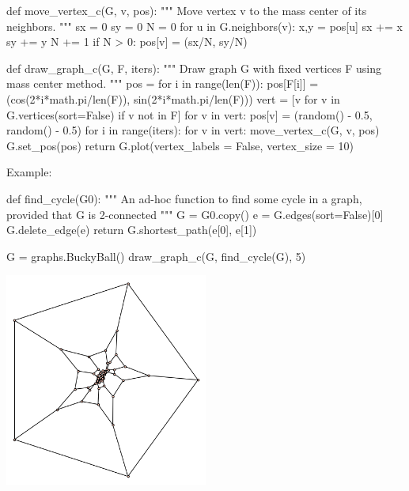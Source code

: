 \medskip
\begin{sageCell}
def move_vertex_c(G, v, pos):
    """
    Move vertex v to the mass center of its neighbors.
    """
    sx = 0
    sy = 0
    N = 0
    for u in G.neighbors(v):
        x,y = pos[u]
        sx += x
        sy += y
        N += 1
    if N > 0:
        pos[v] = (sx/N, sy/N)
\end{sageCell}
\begin{sageCell}
def draw_graph_c(G, F, iters):
    """
    Draw graph G with fixed vertices F using mass center method.
    """
    pos = {}
    for i in range(len(F)):
        pos[F[i]] = (cos(2*i*math.pi/len(F)), sin(2*i*math.pi/len(F)))
    vert = [v for v in G.vertices(sort=False) if v not in F]
    for v in vert:
        pos[v] = (random() - 0.5, random() - 0.5)
    for i in range(iters):
        for v in vert:
            move_vertex_c(G, v, pos)
    G.set_pos(pos)
    return G.plot(vertex_labels = False, vertex_size = 10)
\end{sageCell}
Example:
\begin{sageCell}
def find_cycle(G0):
    """
    An ad-hoc function to find some cycle in a graph, provided that G is 2-connected
    """
    G = G0.copy()
    e = G.edges(sort=False)[0]
    G.delete_edge(e)
    return G.shortest_path(e[0], e[1])
\end{sageCell}
\begin{sageCell}
    G = graphs.BuckyBall()
    draw_graph_c(G, find_cycle(G), 5)
\end{sageCell}

\begin{outImage}
    \includegraphics[width=0.5\textwidth]{Images/Drawing/bucky_ball_mass_5.png}
\end{outImage}

